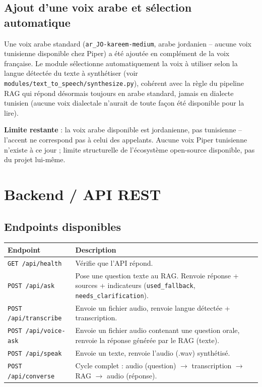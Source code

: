 \documentclass[11pt,a4paper]{report}
\begin{document}
\section{Ajout d'une voix arabe et sélection automatique}
Une voix arabe standard (\texttt{ar\_JO-kareem-medium}, arabe jordanien -- aucune voix
tunisienne disponible chez Piper) a été ajoutée en complément de la voix française. Le
module sélectionne automatiquement la voix à utiliser selon la langue détectée du texte à
synthétiser (voir \texttt{modules/text\_to\_speech/synthesize.py}), cohérent avec la
règle du pipeline RAG qui répond désormais toujours en arabe standard, jamais en dialecte
tunisien (aucune voix dialectale n'aurait de toute façon été disponible pour la lire).

\begin{statutlimite}
\textbf{Limite restante} : la voix arabe disponible est jordanienne, pas tunisienne --
l'accent ne correspond pas à celui des appelants. Aucune voix Piper tunisienne
n'existe à ce jour ; limite structurelle de l'écosystème open-source disponible, pas du
projet lui-même.
\end{statutlimite}

\chapter{Backend / API REST}

\section{Endpoints disponibles}
\begin{center}
\begin{longtable}{@{}p{3.2cm}p{10.5cm}@{}}
\toprule
\textbf{Endpoint} & \textbf{Description} \\
\midrule
\endhead
\texttt{GET /api/health} & Vérifie que l'API répond. \\
\texttt{POST /api/ask} & Pose une question texte au RAG. Renvoie réponse + sources +
indicateurs (\texttt{used\_fallback}, \texttt{needs\_clarification}). \\
\texttt{POST /api/transcribe} & Envoie un fichier audio, renvoie langue détectée +
transcription. \\
\texttt{POST /api/voice-ask} & Envoie un fichier audio contenant une question orale,
renvoie la réponse générée par le RAG (texte). \\
\texttt{POST /api/speak} & Envoie un texte, renvoie l'audio (.wav) synthétisé. \\
\texttt{POST /api/converse} & Cycle complet : audio (question) $\to$ transcription
$\to$ RAG $\to$ audio (réponse). \\
\bottomrule
\end{longtable}
\end{center}
\end{document}
